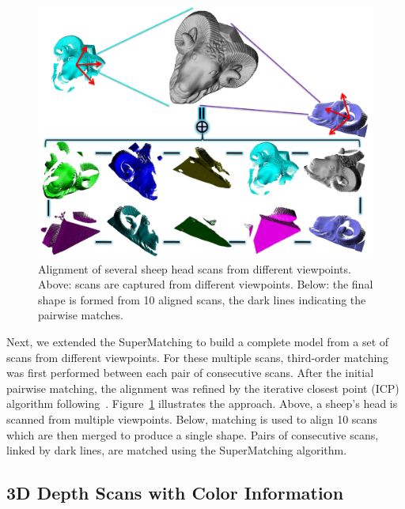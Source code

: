 \begin{figure}[t!]
\centering
  \includegraphics[width=0.99\linewidth]{figures/3DRigid.pdf}
  \caption{Alignment of several sheep head scans from different viewpoints.
  Above: scans are captured from different viewpoints. Below: the final shape is formed from 10 aligned scans, the dark lines indicating the pairwise matches.}
\label{fig:3DRigid}
\end{figure}

Next, we extended the SuperMatching to build a complete model from a set of scans from different viewpoints.
For these multiple scans,  third-order matching was first performed between each pair of consecutive scans.
After the initial pairwise matching, the alignment was refined by the iterative closest point (ICP) algorithm following~\cite{Gelfand05}.
Figure~\ref{fig:3DRigid} illustrates the approach.
Above, a sheep's head is scanned from multiple viewpoints. Below, matching is used to align 10 scans which are then merged to produce a single shape.
Pairs of consecutive scans, linked by dark lines, are matched using the SuperMatching algorithm.


\subsection{3D Depth Scans with Color Information}
\label{subsec:3dColored}

